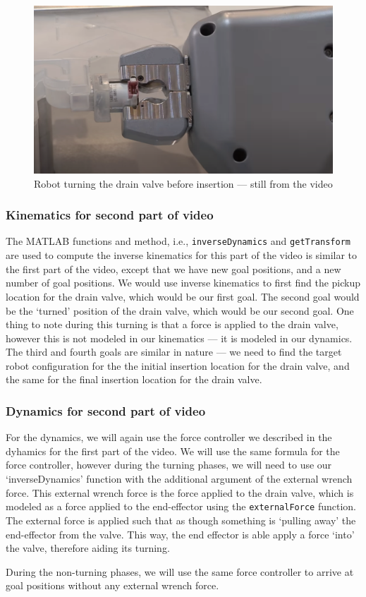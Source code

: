 \documentclass[conference]{IEEEtran}
\begin{document}
\begin{figure}[h!]
    \centering
    \includegraphics[scale=0.2]{kuka-valve-insertion.png}
    \caption{Robot turning the drain valve before insertion --- still from the video}
    \label{kuka-drain-valve-insertion}
\end{figure}

\subsubsection{Kinematics for second part of video}

The MATLAB functions and method, i.e., \texttt{inverseDynamics} and \texttt{getTransform} are used to compute the inverse kinematics for this part of the video is similar to the first part of the
video, except that we have new goal positions, and a new number of goal positions. We would
use inverse kinematics to first find the pickup location for the drain valve, which would be our
first goal. The second goal would be the `turned' position of the drain valve, which would be
our second goal. One thing to note during this turning is that a force is applied to the drain
valve, however this is not modeled in our kinematics --- it is modeled in our dynamics.
The third and fourth goals are similar in nature --- we need to find the target robot configuration for the the initial insertion location
for the drain valve, and the same for the final insertion location for the drain valve.

\subsubsection{Dynamics for second part of video}
For the dynamics, we will again use the force controller we described in the dyhamics for the first part
of the video. We will use the same formula for the force controller, however during the turning phases, we will need to use
our `inverseDynamics' function with the additional argument of the external wrench force. This external
wrench force is the force applied to the drain valve, which is modeled as a force applied to the end-effector
using the \texttt{externalForce} function. The external force is applied such that as though something
is `pulling away' the end-effector from the valve. This way, the end effector is able apply a force `into'
the valve, therefore aiding its turning.

During the non-turning phases, we will use the same force controller to arrive at goal
positions without any external wrench force.


\end{document}
